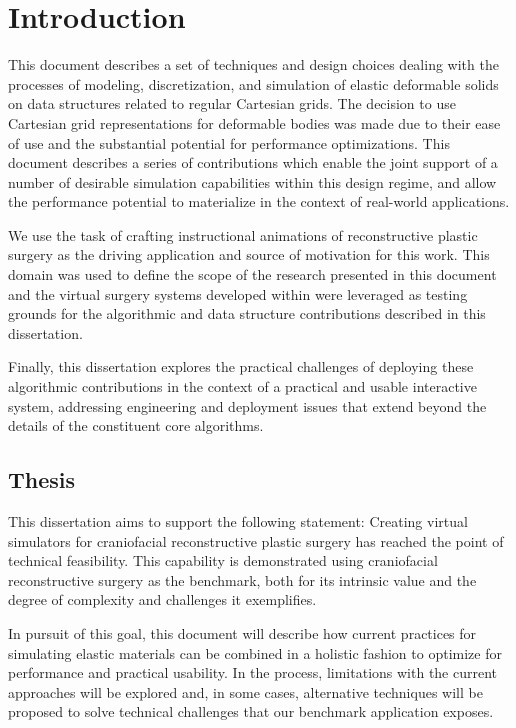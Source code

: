 \chapter{Introduction}

This document describes a set of techniques and design choices
dealing with the processes of modeling, discretization, and simulation
of elastic deformable solids on data structures related to regular
Cartesian grids. The decision to use Cartesian grid representations
for deformable bodies was made due to their ease of use and the
substantial potential for performance optimizations. This document
describes a series of contributions which enable the joint support of
a number of desirable simulation capabilities within this design
regime, and allow the performance potential to materialize in the
context of real-world applications.

We use the task of crafting instructional animations of reconstructive
plastic surgery as the driving application and source of motivation
for this work. This domain was used to define the scope of the
research presented in this document and the virtual surgery systems
developed within were leveraged as testing grounds for the algorithmic
and data structure contributions described in this dissertation.

Finally, this dissertation explores the practical challenges of
deploying these algorithmic contributions in the context of a
practical and usable interactive system, addressing engineering and
deployment issues that extend beyond the details of the constituent
core algorithms.

\section{Thesis}

This dissertation aims to support the following statement: Creating 
virtual simulators for craniofacial reconstructive plastic surgery has
reached the point of technical feasibility. This capability is
demonstrated using craniofacial reconstructive surgery as the
benchmark, both for its intrinsic value and the degree of complexity
and challenges it exemplifies.

In pursuit of this goal, this document will describe how current
practices for simulating elastic materials can be combined in a
holistic fashion to optimize for performance and practical
usability. In the process, limitations with the current approaches
will be explored and, in some cases, alternative techniques will be
proposed to solve technical challenges that our benchmark application
exposes.


